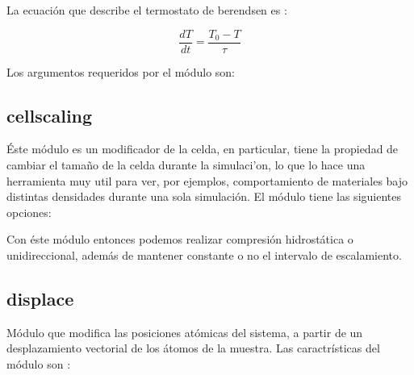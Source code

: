 La ecuaci\'on que describe el termostato de berendsen es :

$$\frac{dT}{dt} = \frac{T_0 - T}{\tau}$$

Los argumentos requeridos por el m\'odulo son:


\subsection{cellscaling}
\'Este m\'odulo es un modificador de la celda, en particular, tiene la propiedad
de cambiar el tama\~no de la celda durante la simulaci'on, lo que lo hace una
herramienta muy util para ver, por ejemplos, comportamiento de materiales bajo
distintas densidades durante una sola simulaci\'on. El m\'odulo tiene las
siguientes opciones:


Con \'este m\'odulo entonces podemos realizar compresi\'on hidrost\'atica o
unidireccional, adem\'as de mantener constante o no el intervalo de
escalamiento.

\subsection{displace}
M\'odulo que modifica las posiciones at\'omicas del sistema, a partir de un
desplazamiento vectorial de los \'atomos de la muestra. Las caractr\'isticas del
m\'odulo son :


